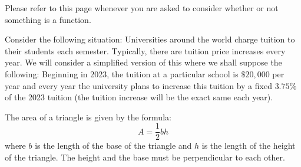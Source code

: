 \documentclass[addpoints, 12pt] {exam}
\begin{document}
Please refer to this page whenever you are asked to consider whether or not something is a function.\newpage
\begin{questions}

\question Consider the following situation: Universities around the world charge tuition to their students each semester. Typically, there are tuition price increases every year. We will consider a simplified version of this where we shall suppose the following: Beginning in 2023, the tuition at a particular school is \(\$20,000\) per year and every year the university plans to increase this tuition by a fixed \(3.75\%\) of the 2023 tuition (the tuition increase will be the exact same each year).
\newpage
\question The area of a triangle is given by the formula: \[A=\frac{1}{2}bh\]where \(b\) is the length of the base of the triangle and \(h\) is the length of the height of the triangle.  The height and the base must be perpendicular to each other.
\begin{parts}

\end{parts}
\end{questions}
\end{document}
